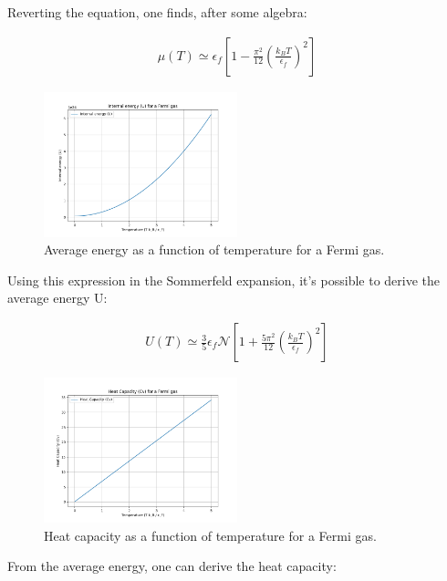 \documentclass{article}
\begin{document}
Reverting the equation, one finds, after some algebra:

\begin{tcolorbox}[colframe=gray!50, colback=gray!10, coltitle=black, title= $\mu(T>0)$]

    \begin{equation}
        \begin{aligned}
            \mu(T)\simeq \epsilon_f\left[1-\frac{\pi^2}{12}\left(\frac{k_BT}{\epsilon_f}\right)^2\right]
        \end{aligned}
    \end{equation}
\end{tcolorbox}


\begin{figure}[h]
    \centering
    \includegraphics[width=0.5\textwidth]{images/u-fermions.png}
    \caption{Average energy as a function of temperature for a Fermi gas.}
    \label{fig:u-fermions}
\end{figure}

Using this expression in the Sommerfeld expansion, it's possible to derive the average energy U:

\begin{tcolorbox}[colframe=gray!50, colback=gray!10, coltitle=black, title= $U(T>0)$]

    \begin{equation}
        \begin{aligned}
            U(T)\simeq \frac{3}{5}\epsilon_f\mathcal{N}\left[1+\frac{5\pi^2}{12}\left(\frac{k_BT}{\epsilon_f}\right)^2\right]
        \end{aligned}
    \end{equation}

\end{tcolorbox}

\begin{figure}[h]
    \centering
    \includegraphics[width=0.5\textwidth]{images/cv-fermions.png}
    \caption{Heat capacity as a function of temperature for a Fermi gas.}
    \label{fig:fermions-heat-capacity}
\end{figure}
From the average energy, one can derive the heat capacity:
\end{document}
